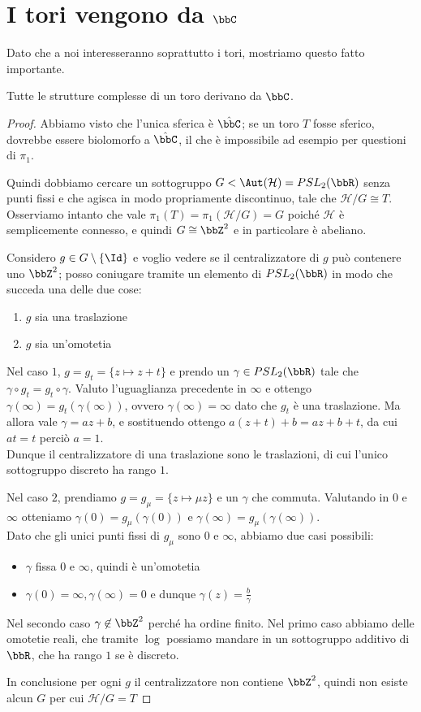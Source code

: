 \section{I tori vengono da $\bbC$}
Dato che a noi interesseranno soprattutto i tori, mostriamo questo fatto importante.
\begin{teorema}
    Tutte le strutture complesse di un toro derivano da $\bbC$.
\end{teorema}
\begin{proof}
    Abbiamo visto che l'unica \sdR sferica è $\hat\bbC$; se un toro $T$ fosse sferico, dovrebbe essere biolomorfo a $\hat\bbC$, il che è impossibile ad esempio per questioni di $\pi_1$.

    Quindi dobbiamo cercare un sottogruppo $G<\Aut(\mathcal H)=PSL_2(\bbR)$ senza punti fissi e che agisca in modo propriamente discontinuo, tale che $\mathcal H / G \cong T$.\\
    Osserviamo intanto che vale $\pi_1(T)=\pi_1(\mathcal H / G) = G$ poiché $\mathcal H$ è semplicemente connesso, e quindi $G\cong \bbZ^2$ e in particolare è abeliano.

    Considero $g\in G \setminus \{\Id\}$ e voglio vedere se il centralizzatore di $g$ può contenere uno $\bbZ^2$; posso coniugare tramite un elemento di $PSL_2(\bbR)$ in modo che succeda una delle due cose:
    \begin{enumerate}
        \item $g$ sia una traslazione
        \item $g$ sia un'omotetia
    \end{enumerate}
    Nel caso $1$, $g=g_t=\{z\mapsto z+t\}$ e prendo un $\gamma\in PSL_2(\bbR)$ tale che $\gamma\circ g_t = g_t\circ \gamma$. Valuto l'uguaglianza precedente in $\infty$ e ottengo $\gamma(\infty)=g_t(\gamma(\infty))$, ovvero $\gamma(\infty)=\infty$ dato che $g_t$ è una traslazione. Ma allora vale $\gamma = az+b$, e sostituendo ottengo $a(z+t)+b=az+b+t$, da cui $at=t$ perciò $a=1$.\\
    Dunque il centralizzatore di una traslazione sono le traslazioni, di cui l'unico sottogruppo discreto ha rango $1$.

    Nel caso $2$, prendiamo $g=g_\mu=\{z\mapsto \mu z\}$ e un $\gamma$ che commuta. Valutando in $0$ e $\infty$ otteniamo $\gamma(0)=g_\mu(\gamma(0))$ e $\gamma(\infty)=g_\mu(\gamma(\infty))$.\\
    Dato che gli unici punti fissi di $g_\mu$ sono $0$ e $\infty$, abbiamo due casi possibili:
    \begin{itemize}
        \item $\gamma$ fissa $0$ e $\infty$, quindi è un'omotetia
        \item $\gamma(0)=\infty,\gamma(\infty)=0$ e dunque $\gamma(z)=\frac b \gamma$
    \end{itemize}
    Nel secondo caso $\gamma\not\in\bbZ^2$ perché ha ordine finito. Nel primo caso abbiamo delle omotetie reali, che tramite $\log$ possiamo mandare in un sottogruppo additivo di $\bbR$, che ha rango $1$ se è discreto.

    In conclusione per ogni $g$ il centralizzatore non contiene $\bbZ^2$, quindi non esiste alcun $G$ per cui $\mathcal H / G = T$
\end{proof}
